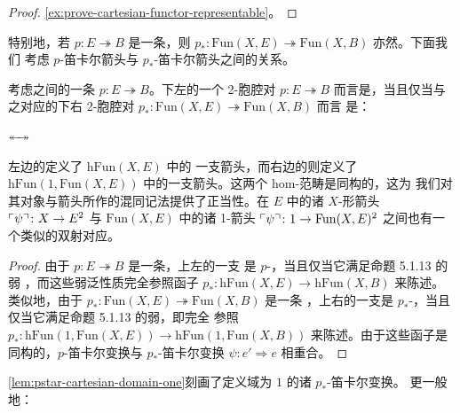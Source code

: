 \begin{proof}
\cref{ex:prove-cartesian-functor-representable}。
\end{proof}

特别地，若 $p\colon E\twoheadrightarrow B$ 是一条\trCartesianFibration，则
$p_{*}\colon\mathrm{Fun}(X,E)\twoheadrightarrow\mathrm{Fun}(X,B)$ 亦然。下面我们
考虑 $p$-笛卡尔箭头与 $p_{*}$-笛卡尔箭头之间的关系。
\begin{lemma}\label{lem:pstar-cartesian-domain-one}
考虑\trInfinityCategory{}之间的一条\trCartesianFibration{}
$p\colon E\twoheadrightarrow B$。下左的一个 2-胞腔对
$p\colon E\twoheadrightarrow B$ 而言是\trCartesian，当且仅当与之对应的下右
2-胞腔对 $p_{*}\colon\mathrm{Fun}(X,E)\twoheadrightarrow\mathrm{Fun}(X,B)$ 而言%
是\trCartesian：
\begin{center}
\quad $\twoheadleftarrow\!\!\twoheadrightarrow$ \quad
{}
\end{center}
\end{lemma}

左边的\trNaturalTransformation{}定义了\trHomCategory{} $\mathrm{hFun}(X,E)$ 中的%
一支箭头，而右边的\trNaturalTransformation{}则定义了\trHomCategory{}
$\mathrm{hFun}(1,\mathrm{Fun}(X,E))$ 中的一支箭头。这两个 hom-范畴是同构的，这为%
我们对其对象与箭头所作的混同记法提供了正当性。在 $E$ 中的诸 $X$-形箭头
$\ulcorner\psi\urcorner\colon X\to E^{2}$ 与 $\mathrm{Fun}(X,E)$ 中的诸 1-箭头
$\ulcorner\psi\urcorner\colon 1\to\mathrm{Fun}(X,E)^{2}$ 之间也有一个类似的双射对应。

\begin{proof}
由于 $p\colon E\twoheadrightarrow B$ 是一条\trCartesianFibration，上左的一支%
\trNaturalTransformation{}是 $p$-\trCartesian，当且仅当它满足命题 5.1.13 的弱%
\trUniversalProperty，而这些弱泛性质完全参照函子
$p_{*}\colon\mathrm{hFun}(X,E)\to\mathrm{hFun}(X,B)$ 来陈述。类似地，由于
$p_{*}\colon\mathrm{Fun}(X,E)\twoheadrightarrow\mathrm{Fun}(X,B)$ 是一条%
\trCartesianFibration，上右的一支\trNaturalTransformation{}是
$p_{*}$-\trCartesian，当且仅当它满足命题 5.1.13 的弱\trUniversalProperty，即完全%
参照 $p_{*}\colon\mathrm{hFun}(1,\mathrm{Fun}(X,E))\to\mathrm{hFun}(1,\mathrm{Fun}(X,B))$
来陈述。由于这些函子是同构的，$p$-笛卡尔变换与 $p_{*}$-笛卡尔变换
$\psi\colon e'\Rightarrow e$ 相重合。
\end{proof}

\cref{lem:pstar-cartesian-domain-one}刻画了定义域为 $1$ 的诸 $p_{*}$-笛卡尔变换。
更一般地：

